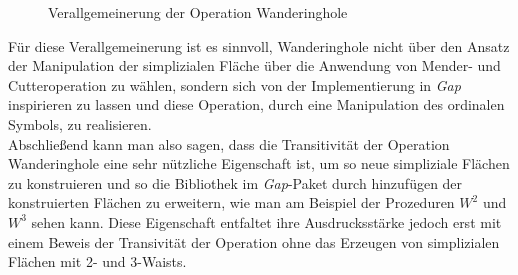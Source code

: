 \documentclass[12pt,titlepage,twoside,cleardoublepage]{article}
\theoremstyle{nummermitklammern}
\numberwithin{equation}{section}
\begin{document}
\begin{figure}[H]
\begin{center}
\end{center}
\caption{Verallgemeinerung der Operation Wanderinghole}
\end{figure}
Für diese Verallgemeinerung ist es sinnvoll, Wanderinghole nicht über den Ansatz der Manipulation der simplizialen Fläche über die Anwendung von Mender- und Cutteroperation zu wählen, sondern sich von der Implementierung in \emph{Gap} inspirieren zu lassen und diese Operation, durch eine Manipulation des ordinalen Symbols, zu realisieren.\\
Abschließend kann man also sagen, dass die Transitivität der Operation Wanderinghole eine sehr nützliche Eigenschaft ist, um so neue simpliziale Flächen zu konstruieren und so die Bibliothek im \emph{Gap}-Paket durch hinzufügen der konstruierten Flächen zu erweitern, wie man am Beispiel der Prozeduren $W^2$ und $W^3$ sehen kann. Diese Eigenschaft entfaltet ihre Ausdrucksstärke jedoch erst mit einem Beweis der Transivität der Operation ohne das Erzeugen von simplizialen Flächen mit 2- und 3-Waists. 
\newpage
\end{document}
